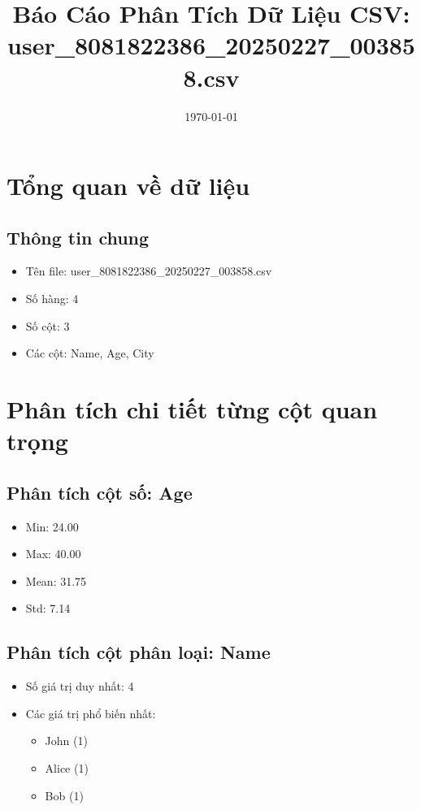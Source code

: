 \documentclass[12pt]{article}
\title{Báo Cáo Phân Tích Dữ Liệu CSV: user\_8081822386\_20250227\_003858.csv}
\author{}
\date{\today}
\begin{document}
\maketitle
\thispagestyle{empty} %

\newpage

\tableofcontents

\newpage

\section{Tổng quan về dữ liệu}

\subsection{Thông tin chung}

\begin{itemize}
    \item Tên file: user\_8081822386\_20250227\_003858.csv
    \item Số hàng: 4
    \item Số cột: 3
    \item Các cột: Name, Age, City
\end{itemize}

\section{Phân tích chi tiết từng cột quan trọng}

\subsection{Phân tích cột số: Age}

\begin{itemize}
    \item Min: 24.00
    \item Max: 40.00
    \item Mean: 31.75
    \item Std: 7.14
\end{itemize}

\subsection{Phân tích cột phân loại: Name}

\begin{itemize}
    \item Số giá trị duy nhất: 4
    \item Các giá trị phổ biến nhất:
    \begin{itemize}
        \item John (1)
        \item Alice (1)
        \item Bob (1)
    \end{itemize}
\end{itemize}
\end{document}
